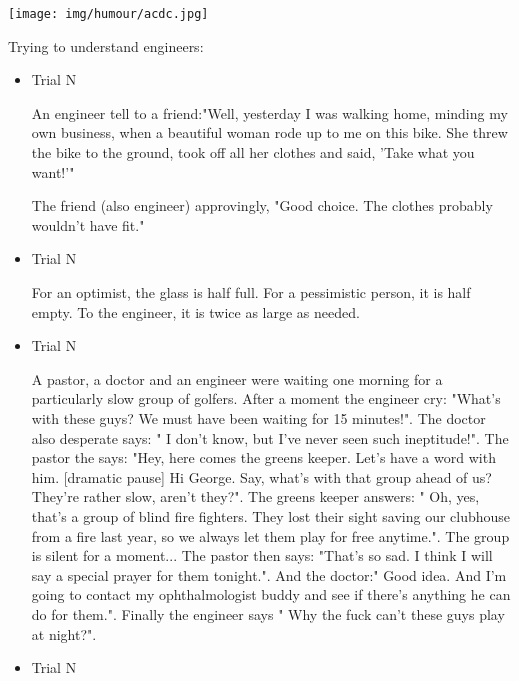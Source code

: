 	\begin{center}
		\texttt{[image: img/humour/acdc.jpg]}
	\end{center}

	\begin{center}\underline{\hspace{5 cm}}\end{center}

	Trying to understand engineers:
	
	\begin{itemize}
	
		\item Trial N
	
	An engineer tell to a friend:"Well, yesterday I was walking home, minding my own business, when a beautiful woman rode up to me on this bike. She threw the bike to the ground, took off all her clothes and said, 'Take what you want!'"
	
	The friend (also engineer) approvingly, "Good choice. The clothes probably wouldn't have fit."
	
		\item Trial N 
	
	For an optimist, the glass is half full.
	For a pessimistic person, it is half empty.
	To the engineer, it is twice as large as needed.
	
		\item Trial N 
	
	A pastor, a doctor and an engineer were waiting one morning for a particularly slow group of golfers. After a moment the engineer cry: "What's with these guys? We must have been waiting for 15 minutes!". The doctor also desperate says: " I don't know, but I've never seen such ineptitude!". The pastor the says: "Hey, here comes the greens keeper. Let's have a word with him. [dramatic pause] Hi George. Say, what's with that group ahead of us? They're rather slow, aren't they?". The greens keeper answers: " Oh, yes, that's a group of blind fire fighters. They lost their sight saving our clubhouse from a fire last year, so we always let them play for free anytime.". The group is silent for a moment... The pastor then says: "That's so sad. I think I will say a special prayer for them tonight.". And the doctor:" Good idea. And I'm going to contact my ophthalmologist buddy and see if there's anything he can do for them.". Finally the engineer says " Why the fuck can't these guys play at night?".
	
		\item Trial N 
	

\end{itemize}

